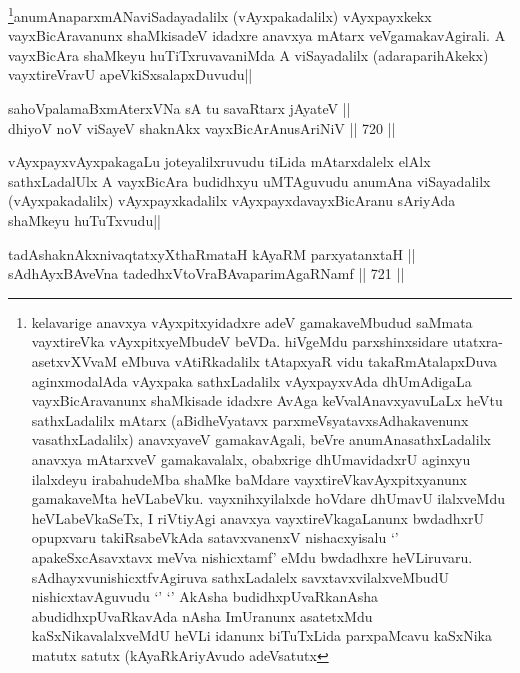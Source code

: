 \begin{artha}
\footnote{kelavarige anavxya vAyxpitxyidadxre adeV gamakaveMbudud  saMmata vayxtireVka vAyxpitxyeMbudeV beVDa. hiVgeMdu parxshinxsidare utatxra-asetxvXVvaM eMbuva vAtiRkadalilx tAtapxyaR vidu takaRmAtalapxDuva aginxmodalAda vAyxpaka sathxLadalilx vAyxpayxvAda dhUmAdigaLa vayxBicAravanunx shaMkisade idadxre AvAga keVvalAnavxyavuLaLx heVtu sathxLadalilx mAtarx (aBidheVyatavx parxmeVsyatavxsAdhakavenunx vasathxLadalilx) anavxyaveV gamakavAgali, beVre anumAnasathxLadalilx anavxya mAtarxveV gamakavalalx, obabxrige dhUmavidadxrU aginxyu ilalxdeyu irabahudeMba shaMke baMdare vayxtireVkavAyxpitxyanunx gamakaveMta heVLabeVku. vayxnihxyilalxde hoVdare dhUmavU ilalxveMdu heVLabeVkaSeTx, I riVtiyAgi anavxya vayxtireVkagaLanunx bwdadhxrU opupxvaru takiRsabeVkAda satavxvanenxV nishacxyisalu `\stext' apakeSxcAsavxtavx meVva nishicxtamf' eMdu bwdadhxre heVLiruvaru. sAdhayxvunishicxtfvAgiruva sathxLadalelx savxtavxvilalxveMbudU nishicxtavAguvudu `\stext' `\stext' AkAsha budidhxpUvaRkanAsha abudidhxpUvaRkavAda nAsha ImUranunx asatetxMdu kaSxNikavalalxveMdU heVLi idanunx biTuTxLida parxpaMcavu kaSxNika matutx satutx (kAyaRkAriyAvudo adeVsatutx}anumAnaparxmANaviSadayadalilx (vAyxpakadalilx) vAyxpayxkekx vayxBicAravanunx shaMkisadeV idadxre anavxya mAtarx veVgamakavAgirali. A vayxBicAra shaMkeyu huTiTxruvavaniMda A viSayadalilx (adaraparihAkekx) vayxtireVravU apeVkiSxsalapxDuvudu||
\end{artha}


\begin{shl}
sahoVpalamaBxmAterxVNa sA tu savaRtarx jAyateV || \\
dhiyoV noV viSayeV shaknAkx vayxBicArAnusAriNiV ||  720 ||  
\end{shl}

\begin{artha}
vAyxpayxvAyxpakagaLu joteyalilxruvudu tiLida mAtarxdalelx elAlx sathxLadalUlx A vayxBicAra budidhxyu uMTAguvudu anumAna viSayadalilx (vAyxpakadalilx) vAyxpayxkadalilx vAyxpayxdavayxBicAranu sAriyAda shaMkeyu huTuTxvudu||
\end{artha}

\begin{shl}
tadAshaknAkxnivaqtatxyXthaRmataH kAyaRM parxyatanxtaH || \\
sAdhAyxBAveVna tadedhxVtoVraBAvaparimAgaRNamf ||  721 ||  
\end{shl}

